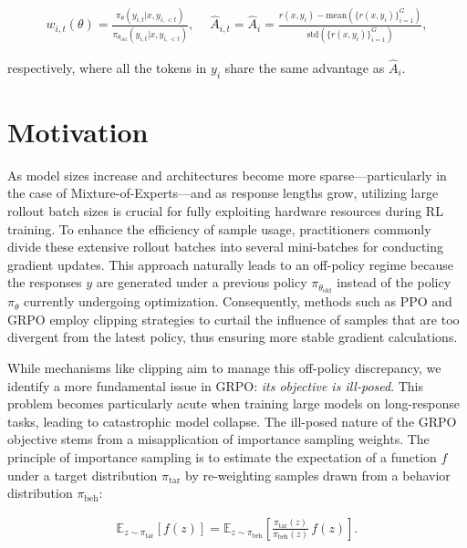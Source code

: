 \begin{align}
    w_{i,t}(\theta)=\frac{ \pi_{\theta} (y_{i,t} | x, y_{i,<t}) }{ \pi_{\theta_\text{old}} (y_{i,t} | x,y_{i,<t})},\quad\ 
    \widehat{A}_{i,t} = \widehat{A}_{i} = \frac{r(x, y_i) - \mathrm{mean} \left( \{ r(x, y_i) \}_{i=1}^G \right) }{ \mathrm{std} \left( \{ r(x, y_i) \}_{i=1}^G \right) },
\end{align}

respectively, where all the tokens in $y_i$ share the same advantage as $\widehat{A}_{i}$.

\section{Motivation}
\label{sec:motivation}

As model sizes increase and architectures become more sparse—particularly in the case of Mixture-of-Experts—and as response lengths grow, utilizing large rollout batch sizes is crucial for fully exploiting hardware resources during RL training. To enhance the efficiency of sample usage, practitioners commonly divide these extensive rollout batches into several mini-batches for conducting gradient updates. This approach naturally leads to an off-policy regime because the responses $y$ are generated under a previous policy $\pi_{\theta_\text{old}}$ instead of the policy $\pi_\theta$ currently undergoing optimization. Consequently, methods such as PPO and GRPO employ clipping strategies to curtail the influence of samples that are too divergent from the latest policy, thus ensuring more stable gradient calculations.

While mechanisms like clipping aim to manage this off-policy discrepancy, we identify a more fundamental issue in GRPO: \textit{its objective is ill-posed}. This problem becomes particularly acute when training large models on long-response tasks, leading to catastrophic model collapse. The ill-posed nature of the GRPO objective stems from a misapplication of importance sampling weights. The principle of importance sampling is to estimate the expectation of a function $f$ under a target distribution $\pi_\text{tar}$ by re-weighting samples drawn from a behavior distribution $\pi_\text{beh}$:

\begin{align}
\mathbb{E}_{z \sim \pi_\text{tar}} \left[ f(z) \right] = \mathbb{E}_{z \sim \pi_\text{beh}} \left[ \frac{ \pi_\text{tar} (z) }{ \pi_\text{beh} (z)} \, f(z) \right].
\end{align}

